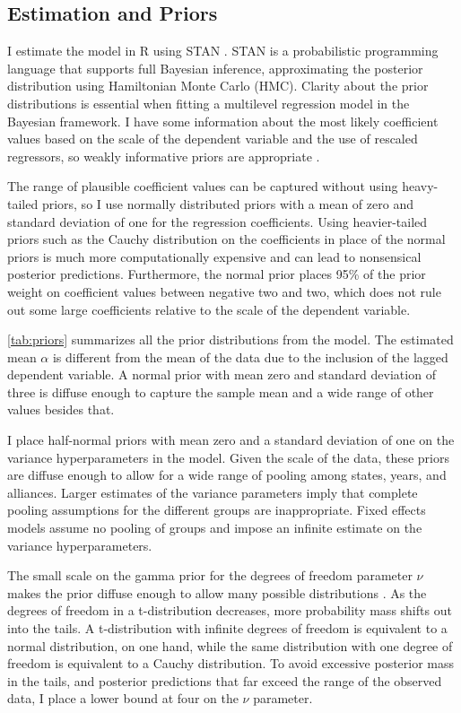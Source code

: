 \documentclass[12pt]{article}
\begin{document}
\subsection*{Estimation and Priors} 

I estimate the model in \textsf{R} using STAN \citep{Carpenteretal2016}. STAN is a probabilistic programming language that supports full Bayesian inference, approximating the posterior distribution using Hamiltonian Monte Carlo (HMC). Clarity about the prior distributions is essential when fitting a multilevel regression model in the Bayesian framework. I have some information about the most likely coefficient values based on the scale of the dependent variable and the use of rescaled regressors, so weakly informative priors are appropriate \citep{Gelmanetal2014}. 

The range of plausible coefficient values can be captured without using heavy-tailed priors, so I use normally distributed priors with a mean of zero and standard deviation of one for the regression coefficients. Using heavier-tailed priors such as the Cauchy distribution on the coefficients in place of the normal priors is much more computationally expensive and can lead to nonsensical posterior predictions. Furthermore, the normal prior places 95\% of the prior weight on coefficient values between negative two and two, which does not rule out some large coefficients relative to the scale of the dependent variable. 

\autoref{tab:priors} summarizes all the prior distributions from the model. The estimated mean $\alpha$ is different from the mean of the data due to the inclusion of the lagged dependent variable. A normal prior with mean zero and standard deviation of three is diffuse enough to capture the sample mean and a wide range of other values besides that. 

I place half-normal priors with mean zero and a standard deviation of one on the variance hyperparameters in the model. Given the scale of the data, these priors are diffuse enough to allow for a wide range of pooling among states, years, and alliances. Larger estimates of the variance parameters imply that complete pooling assumptions for the different groups are inappropriate. Fixed effects models assume no pooling of groups and impose an infinite estimate on the variance hyperparameters. 

The small scale on the gamma prior for the degrees of freedom parameter $\nu$ makes the prior diffuse enough to allow many possible distributions \citep{JuarezSteele2010}. As the degrees of freedom in a t-distribution decreases, more probability mass shifts out into the tails. A t-distribution with infinite degrees of freedom is equivalent to a normal distribution, on one hand, while the same distribution with one degree of freedom is equivalent to a Cauchy distribution. To avoid excessive posterior mass in the tails, and posterior predictions that far exceed the range of the observed data, I place a lower bound at four on the $\nu$ parameter. 
\end{document}
